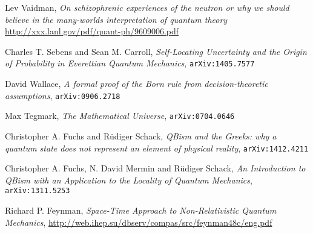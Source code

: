 \begin{thebibliography}{99}
  Lev Vaidman,
  \textit{On schizophrenic experiences of the neutron or why we should believe in the many-worlds interpretation of quantum theory}
  \url{http://xxx.lanl.gov/pdf/quant-ph/9609006.pdf}

  Charles T. Sebens and Sean M. Carroll,
  \textit{Self-Locating Uncertainty and the Origin of Probability in Everettian Quantum Mechanics},
  \texttt{arXiv:1405.7577}

  David Wallace,
  \textit{A formal proof of the Born rule from decision-theoretic assumptions},
  \texttt{arXiv:0906.2718}

  Max Tegmark,
  \textit{The Mathematical Universe},
  \texttt{arXiv:0704.0646}

  Christopher A. Fuchs and Rüdiger Schack,
  \textit{QBism and the Greeks: why a quantum state does not represent an element of physical reality},
  \texttt{arXiv:1412.4211}

  Christopher A. Fuchs, N. David Mermin and Rüdiger Schack,
  \textit{An Introduction to QBism with an Application to the Locality of Quantum Mechanics},
  \texttt{arXiv:1311.5253}

  Richard P. Feynman,
  \textit{Space-Time Approach to Non-Relativistic Quantum Mechanics},
  \url{http://web.ihep.su/dbserv/compas/src/feynman48c/eng.pdf}


\end{thebibliography}
